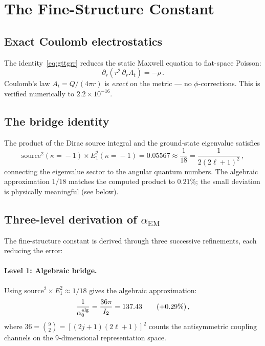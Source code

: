 \documentclass[aps,prd,twocolumn,superscriptaddress,nofootinbib,longbibliography]{revtex4-2}
\newcommand{\aEM}{\alpha_{\mathrm{EM}}}
\begin{document}
\section{The Fine-Structure Constant}\label{sec:alpha}

\subsection{Exact Coulomb electrostatics}

The identity~\eqref{eq:gttgrr} reduces the static Maxwell equation to
flat-space Poisson:
\begin{equation}
  \partial_r(r^2\,\partial_r A_t) = -\rho\,.
\end{equation}
Coulomb's law $A_t = Q/(4\pi r)$ is \emph{exact} on the
metric --- no $\phi$-corrections.  This is verified numerically to
$2.2 \times 10^{-16}$.

\subsection{The bridge identity}

The product of the Dirac source integral and the ground-state
eigenvalue satisfies
\begin{equation}\label{eq:bridge}
  \mathrm{source}^2(\kappa\!=\!{-}1) \times E_1^2(\kappa\!=\!{-}1)
  = 0.05567
  \approx \frac{1}{18}
  = \frac{1}{2(2\ell+1)^2}\,,
\end{equation}
connecting the eigenvalue sector to the angular quantum numbers.  The
algebraic approximation $1/18$ matches the computed product to
$0.21\%$; the small deviation is physically meaningful (see below).

\subsection{Three-level derivation of $\aEM$}\label{sec:alpha-chain}

The fine-structure constant is derived through three successive
refinements, each reducing the error:

\paragraph{Level 1: Algebraic bridge.}  Using $\mathrm{source}^2
\times E_1^2 \approx 1/18$ gives the algebraic approximation:
\begin{equation}\label{eq:alpha-bare}
  \frac{1}{\alpha_0^{\rm alg}}
  = \frac{36\pi}{I_2} = 137.43
  \qquad(+0.29\%)\,,
\end{equation}
where $36 = \binom{9}{2} = [(2j\!+\!1)(2\ell\!+\!1)]^2$ counts the
antisymmetric coupling channels on the 9-dimensional
representation space.
\end{document}
